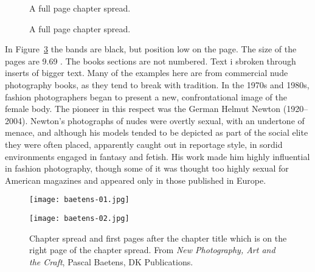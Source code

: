 \begin{figure}[htbp]
\parindent=0pt
\centering
{}\par
\vfill

\par
\caption{A full page chapter spread.}
\label{fig:threepage}
\end{figure}

\begin{figure}[htbp]
\parindent=0pt
\centering
{}\par
\vfill

\par
\caption{A full page chapter spread.}
\label{fig:threepage}
\end{figure}


\clearpage



In Figure~\ref{fig:photospread} the bands are black, but position low on the page. The size of the pages are 9.69 . The books sections are not numbered. Text i sbroken through inserts of bigger text. Many of the examples here are from
commercial nude photography books, as they tend to break with tradition. In the 1970s and 1980s, fashion photographers began to present a
new, confrontational image of the female body. The pioneer in this
respect was the German Helmut Newton (1920–2004). Newton’s
photographs of nudes were overtly sexual, with an undertone of
menace, and although his models tended to be depicted as part
of the social elite they were often placed, apparently caught out
in reportage style, in sordid environments engaged in fantasy and
fetish. His work made him highly influential in fashion photography,
though some of it was thought too highly sexual for American
magazines and appeared only in those published in Europe.


\begin{figure}[htbp]
\parindent=0pt
\texttt{[image: baetens-01.jpg]} \par
\vfill\vfill\vfill\vfill
\texttt{[image: baetens-02.jpg]}\par
\caption{Chapter spread and first pages after the chapter title which is on the right page of the chapter spread. From \textit{New Photography, Art and the Craft}, Pascal Baetens, DK Publications. }
\label{fig:photospread}
\end{figure}

